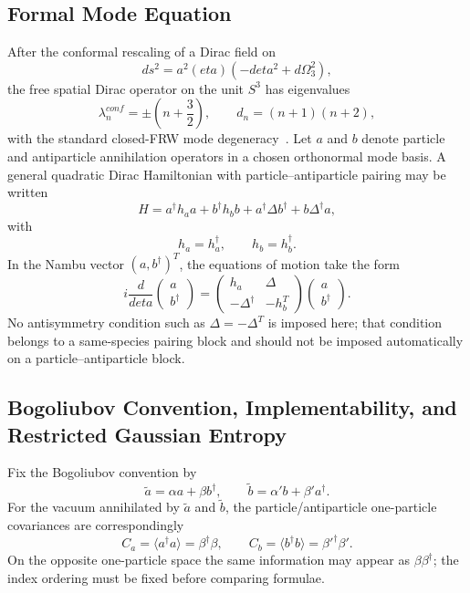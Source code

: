 \documentclass[11pt]{article}
\theoremstyle{canonmath}
\theoremstyle{canonpostulate}
\theoremstyle{canonclaim}
\def\mathrm#1{#1}%
\def\eta{eta}%
\begin{document}
\subsection{Formal Mode Equation}
After the conformal rescaling of a Dirac field on
\begin{equation}
ds^2=a^2(\eta)\left(-d\eta^2+d\Omega_3^2\right),
\end{equation}
the free spatial Dirac operator on the unit $S^3$ has eigenvalues
\begin{equation}
\lambda_n^{\mathrm{conf}}=\pm\left(n+\frac32\right),\qquad d_n=(n+1)(n+2),
\end{equation}
with the standard closed-FRW mode degeneracy~\cite{CortezDiracFRW}. Let $a$ and $b$ denote particle and antiparticle annihilation operators in a chosen orthonormal mode basis. A general quadratic Dirac Hamiltonian with particle--antiparticle pairing may be written
\begin{equation}
H=a^\dagger h_a a+b^\dagger h_b b+a^\dagger\Delta b^\dagger+b\Delta^\dagger a,
\end{equation}
with
\begin{equation}
h_a=h_a^\dagger,\qquad h_b=h_b^\dagger.
\end{equation}
In the Nambu vector $(a,b^\dagger)^T$, the equations of motion take the form
\begin{equation}
i\frac{d}{d\eta}\begin{pmatrix}a\\ b^\dagger\end{pmatrix}
=\begin{pmatrix}h_a&\Delta\\-\Delta^\dagger&-h_b^T\end{pmatrix}\begin{pmatrix}a\\ b^\dagger\end{pmatrix}.
\label{eq:nambu}
\end{equation}
No antisymmetry condition such as $\Delta=-\Delta^T$ is imposed here; that condition belongs to a same-species pairing block and should not be imposed automatically on a particle--antiparticle block.

\subsection{Bogoliubov Convention, Implementability, and Restricted Gaussian Entropy}
Fix the Bogoliubov convention by
\begin{equation}
\widetilde a=\alpha a+\beta b^\dagger,\qquad\widetilde b=\alpha' b+\beta' a^\dagger.
\end{equation}
For the vacuum annihilated by $\widetilde a$ and $\widetilde b$, the particle/antiparticle one-particle covariances are correspondingly
\begin{equation}
C_a=\langle a^\dagger a\rangle=\beta^\dagger\beta,\qquad C_b=\langle b^\dagger b\rangle=\beta'^\dagger\beta'.
\end{equation}
On the opposite one-particle space the same information may appear as $\beta\beta^\dagger$; the index ordering must be fixed before comparing formulae.
\end{document}
